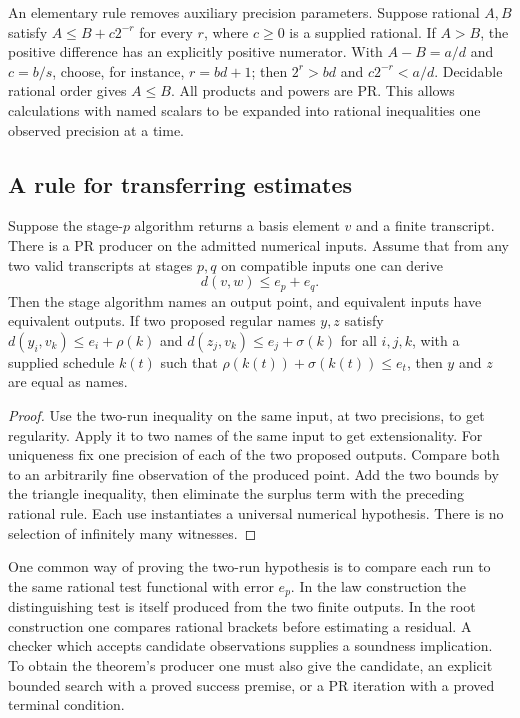 An elementary rule removes auxiliary precision parameters. Suppose rational
$A,B$ satisfy $A\le B+c2^{-r}$ for every $r$, where $c\ge0$ is a supplied
rational. If $A>B$, the positive difference has an explicitly positive
numerator. With $A-B=a/d$ and $c=b/s$, choose, for instance, $r=bd+1$;
then $2^r>bd$ and $c2^{-r}<a/d$. Decidable rational order gives $A\le B$.
All products and powers are PR. This allows calculations with named scalars to
be expanded into rational inequalities one observed precision at a time.

\subsection{A rule for transferring estimates}

\begin{theorem}\label{thm:tworuns}
Suppose the stage-$p$ algorithm returns a basis element $v$ and a finite
transcript. There is a PR producer on the admitted numerical inputs. Assume
that from any two valid transcripts at stages $p,q$ on compatible inputs one
can derive
\[
                          d(v,w)\le e_p+e_q.
\]
Then the stage algorithm names an output point, and equivalent inputs have
equivalent outputs. If two proposed regular names $y,z$ satisfy
$d(y_i,v_k)\le e_i+\rho(k)$ and $d(z_j,v_k)\le e_j+\sigma(k)$ for all
$i,j,k$, with a supplied schedule $k(t)$ such that
$\rho(k(t))+\sigma(k(t))\le e_t$, then $y$ and $z$ are equal as names.
\end{theorem}
\begin{proof}
Use the two-run inequality on the same input, at two precisions, to get
regularity. Apply it to two names of the same input to get extensionality.
For uniqueness fix one precision of each of the two proposed outputs. Compare
both to an arbitrarily fine observation of the produced point. Add the
two bounds by the triangle inequality, then eliminate the surplus term with
the preceding rational rule. Each use instantiates a universal numerical
hypothesis. There is no selection of infinitely many witnesses.
\end{proof}

One common way of proving the two-run hypothesis is to compare each run to
the same rational test functional with error $e_p$. In the law construction
the distinguishing test is itself produced from the two finite outputs.
In the root construction one compares rational brackets before estimating
a residual. A checker which accepts candidate observations supplies a soundness
implication. To obtain the theorem's producer one must also give the candidate,
an explicit bounded search with a proved success premise, or a PR iteration
with a proved terminal condition.

